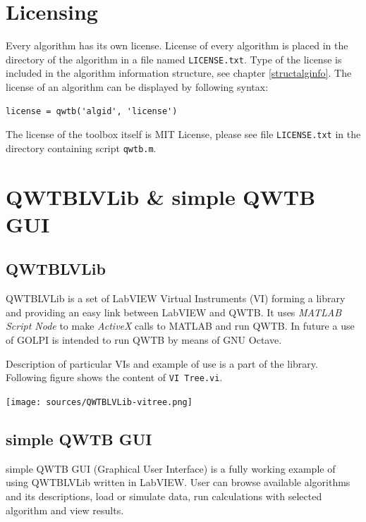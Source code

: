\documentclass[12pt,a4paper,oneside]{report} %
\def\matlab{{\sc MATLAB}\xspace}
\def\octave{{\sc GNU Octave}\xspace}
\def\labview{{\sc LabVIEW}\xspace}
\begin{document}
\chapter{Licensing} %
\label{ch-license}
Every algorithm has its own license. License of every algorithm is placed in the directory of the
algorithm in a file named {\tt LICENSE.txt}. Type of the license is included in the algorithm information structure, see
chapter \ref{structalginfo}. The license of an algorithm can be displayed by following syntax:
\begin{lstlisting}
license = qwtb('algid', 'license')
\end{lstlisting}

The license of the toolbox itself is MIT License, please see file {\tt LICENSE.txt} in the directory
containing script {\tt qwtb.m}.

\chapter{QWTBLVLib \& simple QWTB GUI} %
\section{QWTBLVLib} %
QWTBLVLib is a set of \labview Virtual Instruments (VI) forming a library and providing an easy link
between \labview and QWTB. It uses {\em MATLAB Script
Node} to make {\em ActiveX} calls to \matlab and run QWTB. In future a use of {\sc GOLPI} is intended to run QWTB
by means of \octave.

Description of particular VIs and example of use is a part of the library.
Following figure shows the content of {\tt VI Tree.vi}.

\begin{center}
        \texttt{[image: sources/QWTBLVLib-vitree.png]}
\end{center}

\section{simple QWTB GUI} %
simple QWTB GUI (Graphical User Interface) is a fully working example of using QWTBLVLib written in \labview.
User can browse available algorithms and its descriptions, load or simulate data, run calculations
with selected algorithm and view results.
\end{document}
